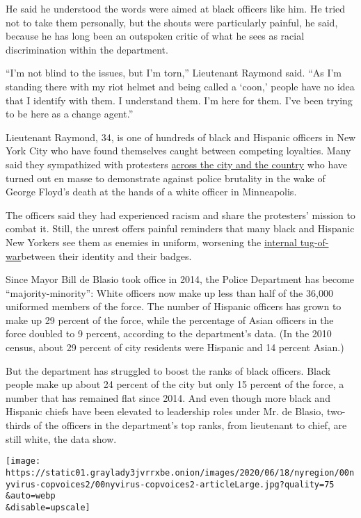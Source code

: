 He said he understood the words were aimed at black officers like him.
He tried not to take them personally, but the shouts were particularly
painful, he said, because he has long been an outspoken critic of what
he sees as racial discrimination within the department.

``I'm not blind to the issues, but I'm torn,'' Lieutenant Raymond said.
``As I'm standing there with my riot helmet and being called a `coon,'
people have no idea that I identify with them. I understand them. I'm
here for them. I've been trying to be here as a change agent.''

Lieutenant Raymond, 34, is one of hundreds of black and Hispanic
officers in New York City who have found themselves caught between
competing loyalties. Many said they sympathized with protesters
\href{https://apnews.com/c33525fc78ad95b39098f720688d2991}{across the
city and the country} who have turned out en masse to demonstrate
against police brutality in the wake of George Floyd's death at the
hands of a white officer in Minneapolis.

The officers said they had experienced racism and share the protesters'
mission to combat it. Still, the unrest offers painful reminders that
many black and Hispanic New Yorkers see them as enemies in uniform,
worsening the
\href{https://www.nytimes3xbfgragh.onion/2016/07/19/nyregion/black-police-officers-feel-the-inner-tug-of-a-dual-role.html}{internal
tug-of-war}between their identity and their badges.

Since Mayor Bill de Blasio took office in 2014, the Police Department
has become ``majority-minority'': White officers now make up less than
half of the 36,000 uniformed members of the force. The number of
Hispanic officers has grown to make up 29 percent of the force, while
the percentage of Asian officers in the force doubled to 9 percent,
according to the department's data. (In the 2010 census, about 29
percent of city residents were Hispanic and 14 percent Asian.)

But the department has struggled to boost the ranks of black officers.
Black people make up about 24 percent of the city but only 15 percent of
the force, a number that has remained flat since 2014. And even though
more black and Hispanic chiefs have been elevated to leadership roles
under Mr. de Blasio, two-thirds of the officers in the department's top
ranks, from lieutenant to chief, are still white, the data show.

\texttt{[image: https://static01.graylady3jvrrxbe.onion/images/2020/06/18/nyregion/00nyvirus-copvoices2/00nyvirus-copvoices2-articleLarge.jpg?quality=75\\\&auto=webp\\\&disable=upscale]}

